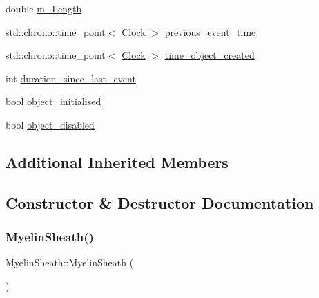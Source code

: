 \begin{DoxyCompactItemize}
\item 
double \mbox{\hyperlink{classMyelinSheath_a90f9cb23a8be59444dd997da5e184553}{m\+\_\+\+Length}}
\item 
std\+::chrono\+::time\+\_\+point$<$ \mbox{\hyperlink{universe_8h_a0ef8d951d1ca5ab3cfaf7ab4c7a6fd80}{Clock}} $>$ \mbox{\hyperlink{classMyelinSheath_a93336530fb4a6210f7bd3ec297192042}{previous\+\_\+event\+\_\+time}}
\item 
std\+::chrono\+::time\+\_\+point$<$ \mbox{\hyperlink{universe_8h_a0ef8d951d1ca5ab3cfaf7ab4c7a6fd80}{Clock}} $>$ \mbox{\hyperlink{classMyelinSheath_a5ff52b5d66d81809d62851ce6b8b12a8}{time\+\_\+object\+\_\+created}}
\item 
int \mbox{\hyperlink{classMyelinSheath_a71de35f1f6326d808253a588c3ca3636}{duration\+\_\+since\+\_\+last\+\_\+event}}
\item 
bool \mbox{\hyperlink{classMyelinSheath_ac5859735cf21fa7456f7bed143f19f6c}{object\+\_\+initialised}}
\item 
bool \mbox{\hyperlink{classMyelinSheath_a60271f6802b2289945aa4f5536b55b34}{object\+\_\+disabled}}
\end{DoxyCompactItemize}
\subsection*{Additional Inherited Members}


\subsection{Constructor \& Destructor Documentation}
\mbox{\label{classMyelinSheath_a298d69acb8d64de018f32443ea015287}} 
\subsubsection{\texorpdfstring{Myelin\+Sheath()}{MyelinSheath()}\hspace{0.1cm}{\footnotesize\ttfamily [1/4]}}
{\footnotesize\ttfamily Myelin\+Sheath\+::\+Myelin\+Sheath (\begin{DoxyParamCaption}{ }\end{DoxyParamCaption})\hspace{0.3cm}{\ttfamily [inline]}}

\mbox{\label{classMyelinSheath_a9f9f90c853f341b5cbf4f2c5035a14af}} 
